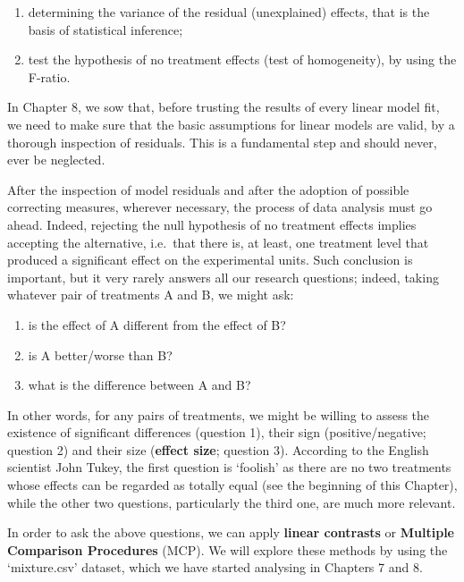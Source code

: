 \documentclass[a4paper,12pt,oneside]{book}
\providecommand{\tightlist}{%
  \setlength{\itemsep}{0pt}\setlength{\parskip}{0pt}}
\begin{document}
\begin{enumerate}
\def\labelenumi{\arabic{enumi}.}
\tightlist
\item
  determining the variance of the residual (unexplained) effects, that is the basis of statistical inference;
\item
  test the hypothesis of no treatment effects (test of homogeneity), by using the F-ratio.
\end{enumerate}

In Chapter 8, we sow that, before trusting the results of every linear model fit, we need to make sure that the basic assumptions for linear models are valid, by a thorough inspection of residuals. This is a fundamental step and should never, ever be neglected.

After the inspection of model residuals and after the adoption of possible correcting measures, wherever necessary, the process of data analysis must go ahead. Indeed, rejecting the null hypothesis of no treatment effects implies accepting the alternative, i.e.~that there is, at least, one treatment level that produced a significant effect on the experimental units. Such conclusion is important, but it very rarely answers all our research questions; indeed, taking whatever pair of treatments A and B, we might ask:

\begin{enumerate}
\def\labelenumi{\arabic{enumi}.}
\tightlist
\item
  is the effect of A different from the effect of B?
\item
  is A better/worse than B?
\item
  what is the difference between A and B?
\end{enumerate}

In other words, for any pairs of treatments, we might be willing to assess the existence of significant differences (question 1), their sign (positive/negative; question 2) and their size (\textbf{effect size}; question 3). According to the English scientist John Tukey, the first question is `foolish' as there are no two treatments whose effects can be regarded as totally equal (see the beginning of this Chapter), while the other two questions, particularly the third one, are much more relevant.

In order to ask the above questions, we can apply \textbf{linear contrasts} or \textbf{Multiple Comparison Procedures} (MCP). We will explore these methods by using the `mixture.csv' dataset, which we have started analysing in Chapters 7 and 8.
\end{document}
